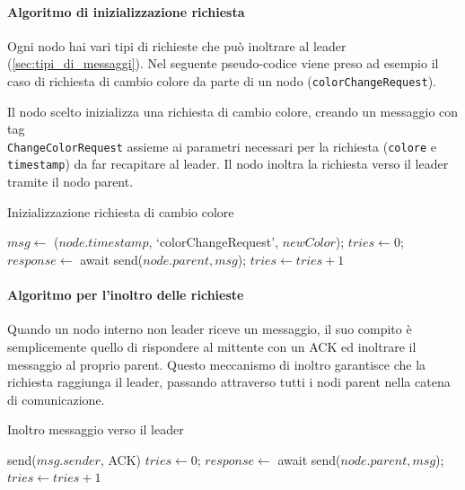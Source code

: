 \documentclass[12pt, a4paper]{report}
\begin{document}
\paragraph{Algoritmo di inizializzazione richiesta}

Ogni nodo hai vari tipi di richieste che pu\`o inoltrare al leader (\ref{sec:tipi_di_messaggi}). Nel seguente pseudo-codice viene preso ad esempio il caso di richiesta di cambio colore da parte di un nodo (\texttt{colorChangeRequest}).

Il nodo scelto inizializza una richiesta di cambio colore, creando un messaggio con tag \\ \texttt{ChangeColorRequest} assieme ai parametri necessari per la richiesta (\texttt{colore} e \texttt{timestamp}) da far recapitare al leader. Il nodo inoltra la richiesta verso il leader tramite il nodo parent.

\begin{algorithm}[H]
\caption{Inizializzazione richiesta di cambio colore}
\begin{algorithmic}[1]
    \State $msg \gets$ ($node.timestamp$, `colorChangeRequest', $newColor$);
    \State $tries \gets 0$;
    \Do
        \State $response \gets$ await send($node.parent, msg$);
        \State $tries \gets tries + 1$
\EndProcedure
\end{algorithmic}
\end{algorithm}

\paragraph{Algoritmo per l'inoltro delle richieste}

Quando un nodo interno non leader riceve un messaggio, il suo compito \`e semplicemente quello di rispondere al mittente con un ACK ed inoltrare il messaggio al proprio parent. Questo meccanismo di inoltro garantisce che la richiesta raggiunga il leader, passando attraverso tutti i nodi parent nella catena di comunicazione.

\begin{algorithm}[H]
\caption{Inoltro messaggio verso il leader}
\begin{algorithmic}[1]
    \State send($msg.sender$, ACK)
    \State $tries \gets 0$;
    \Do
        \State $response \gets$ await send($node.parent, msg$);
        \State $tries \gets tries + 1$
\EndProcedure
\end{algorithmic}
\end{algorithm}
\end{document}
